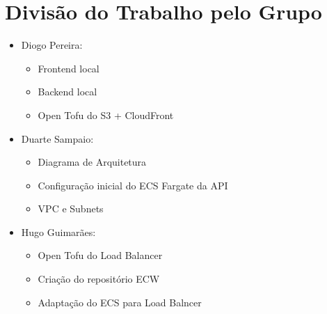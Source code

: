 \section{Divisão do Trabalho pelo Grupo}
\begin{itemize}
	\item Diogo Pereira:
	\begin{itemize}
		\item Frontend local
		\item Backend local
		\item Open Tofu do S3 + CloudFront
	\end{itemize}
	
	\item Duarte Sampaio:
	\begin{itemize}
		\item Diagrama de Arquitetura
		\item Configuração inicial do ECS Fargate da API
		\item VPC e Subnets
	\end{itemize}
	
	\item Hugo Guimarães:
	\begin{itemize}
		\item Open Tofu do Load Balancer
		\item Criação do repositório ECW
		\item Adaptação do ECS para Load Balncer
	\end{itemize}
\end{itemize}